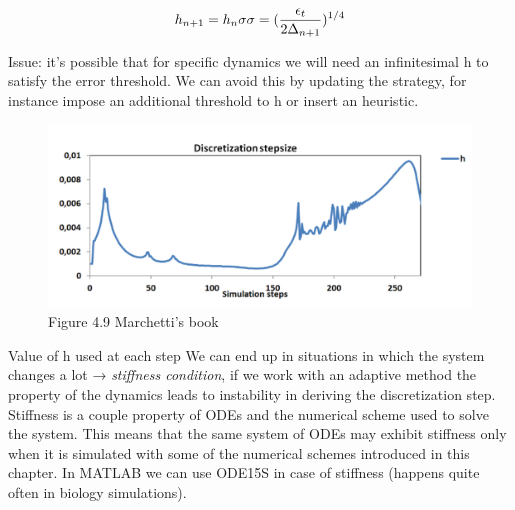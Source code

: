   $$h_{n+1}=h_n\sigma \\ \sigma =(\frac{\epsilon_t}{2\Delta_{n+1}})^{1/4}$$

  Issue: it's possible that for specific dynamics we will need an infinitesimal h to satisfy the error threshold.
  We can avoid this by updating the strategy, for instance impose an additional threshold to h or insert an heuristic.

 

\begin{figure}
  \centering
   \includegraphics[width=\textwidth]{discretization.png}
  \caption{ Figure 4.9 Marchetti's book}
\end{figure}
 
  Value of h used at each step We can end up in situations in which the system changes a lot → \emph{stiffness condition}, if we work with an adaptive method the property of the dynamics leads to instability in deriving the discretization step.
  Stiffness is a couple property of ODEs and the numerical scheme used to solve the system.
  This means that the same system of ODEs may exhibit stiffness only when it is simulated with some of the numerical schemes introduced in this chapter.
  In MATLAB we can use ODE15S in case of stiffness (happens quite often in biology simulations).
